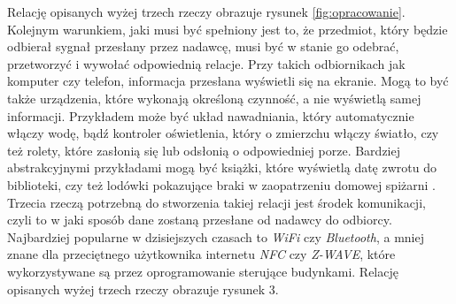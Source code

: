 \documentclass[brudnopis]{xmgr}
\begin{document}
Relację opisanych wyżej trzech rzeczy obrazuje rysunek \ref{fig:opracowanie}.
Kolejnym warunkiem, jaki musi być spełniony jest to, że przedmiot, który będzie odbierał sygnał przesłany przez nadawcę, musi być w stanie go odebrać, przetworzyć i wywołać odpowiednią relacje. Przy takich odbiornikach jak komputer czy telefon, informacja przesłana wyświetli się na ekranie. Mogą to być także urządzenia, które wykonają określoną czynność, a nie wyświetlą samej informacji. Przykładem może być układ nawadniania, który automatycznie włączy wodę, bądź kontroler oświetlenia, który o zmierzchu włączy światło, czy też rolety, które zasłonią się lub odsłonią o odpowiedniej porze. Bardziej abstrakcyjnymi przykładami mogą być książki, które wyświetlą datę zwrotu do biblioteki, czy też lodówki pokazujące braki w zaopatrzeniu domowej spiżarni \cite{Designing}.  
Trzecia rzeczą potrzebną do stworzenia takiej relacji jest środek komunikacji, czyli to w jaki sposób dane zostaną przesłane od nadawcy do odbiorcy. Najbardziej popularne w dzisiejszych czasach to \emph{WiFi} czy \emph{Bluetooth}, a mniej znane dla przeciętnego użytkownika internetu \emph{NFC} czy \emph{Z-WAVE}, które wykorzystywane są przez oprogramowanie sterujące  budynkami. Relację opisanych wyżej trzech rzeczy obrazuje rysunek 3.
\end{document}
